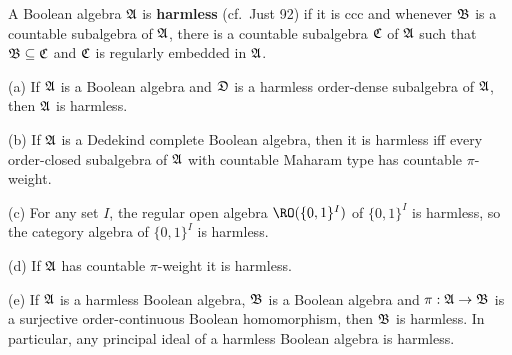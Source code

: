  A Boolean algebra $\frak A$ is {\bf harmless}
(cf.\ {\smc Just 92}) if it is ccc
and whenever $\frak B$ is a countable subalgebra of
$\frak A$, there is a countable subalgebra $\frak C$ of $\frak A$ such that
$\frak B\subseteq\frak C$ and $\frak C$ is regularly embedded in $\frak A$.

 (a) If $\frak A$ is a Boolean algebra and $\frak D$
is a harmless
order-dense subalgebra of $\frak A$, then $\frak A$ is harmless.

(b) If $\frak A$ is a Dedekind complete Boolean algebra, then it is
harmless iff
every order-closed subalgebra of $\frak A$ with countable Maharam type
has countable $\pi$-weight.

(c) For any set $I$, the regular open algebra $\RO(\{0,1\}^I)$
of $\{0,1\}^I$ is harmless, so the category algebra of $\{0,1\}^I$ is
harmless.

(d) If $\frak A$ has countable $\pi$-weight it is harmless.

(e) If $\frak A$ is a harmless Boolean algebra, $\frak B$ is a Boolean
algebra and $\pi:\frak A\to\frak B$ is a surjective order-continuous
Boolean homomorphism, then
$\frak B$ is harmless.   In particular,
any principal ideal of a harmless Boolean algebra is harmless.

